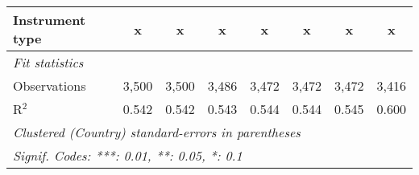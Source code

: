 \begin{table}[htbp]
\begin{tabular}{lccccccc}
      Instrument type                                                  & x              & x              & x              & x              & x              & x              & x\\  
      \midrule \emph{Fit statistics}\\
      Observations                                                     & 3,500          & 3,500          & 3,486          & 3,472          & 3,472          & 3,472          & 3,416\\  
      R$^2$                                                            & 0.542          & 0.542          & 0.543          & 0.544          & 0.544          & 0.545          & 0.600\\  
      \midrule
      \multicolumn{8}{l}{\emph{Clustered (Country) standard-errors in parentheses}}\\
      \multicolumn{8}{l}{\emph{Signif. Codes: ***: 0.01, **: 0.05, *: 0.1}}\\
   \end{tabular}
\end{table}


